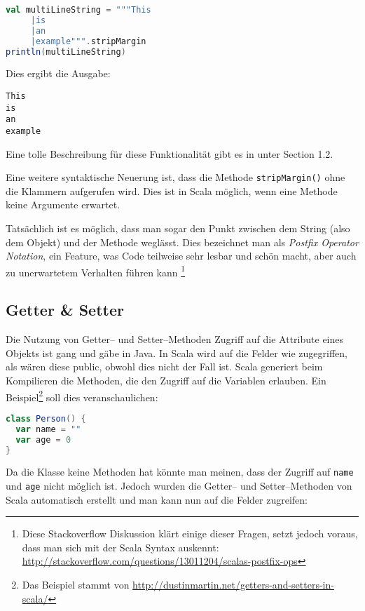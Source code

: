 \begin{lstlisting}[language=Scala]
val multiLineString = """This
     |is
     |an
     |example""".stripMargin
println(multiLineString)
\end{lstlisting}

Dies ergibt die Ausgabe:

\begin{verbatim}
This
is
an
example
\end{verbatim}

Eine tolle Beschreibung für diese Funktionalität gibt es in \cite{ScalaCookbook} unter Section 1.2.

Eine weitere syntaktische Neuerung ist, dass die Methode \texttt{stripMargin()} ohne die Klammern aufgerufen wird. Dies ist in Scala möglich, wenn eine Methode keine Argumente erwartet.

Tatsächlich ist es möglich, dass man sogar den Punkt zwischen dem String (also dem Objekt) und der Methode weglässt. Dies bezeichnet man als \textit{Postfix Operator Notation}, ein Feature, was Code teilweise sehr lesbar und schön macht, aber auch zu unerwartetem Verhalten führen kann \footnote{Diese Stackoverflow Diskussion klärt einige dieser Fragen, setzt jedoch voraus, dass man sich mit der Scala Syntax auskennt: \url{http://stackoverflow.com/questions/13011204/scalas-postfix-ops}}

\subsection{Getter \& Setter}\label{sec:getter-and-setter}
Die Nutzung von Getter-- und Setter--Methoden Zugriff auf die Attribute eines Objekts ist gang und gäbe in Java. In Scala wird auf die Felder wie zugegriffen, als wären diese public, obwohl dies nicht der Fall ist. Scala generiert beim Kompilieren die Methoden, die den Zugriff auf die Variablen erlauben. Ein Beispiel\footnote{Das Beispiel stammt von \url{http://dustinmartin.net/getters-and-setters-in-scala/}} soll dies veranschaulichen:

\begin{lstlisting}[language=Scala, caption=Beispiel Klasse Person]
class Person() {
  var name = ""
  var age = 0
}
\end{lstlisting}

Da die Klasse keine Methoden hat könnte man meinen, dass der Zugriff auf \texttt{name} und \texttt{age} nicht möglich ist. Jedoch wurden die Getter-- und Setter--Methoden von Scala automatisch erstellt und man kann nun auf die Felder zugreifen:

